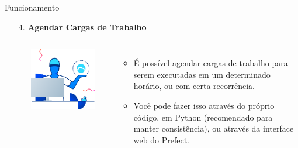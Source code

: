 \documentclass[t,serif]{beamer}
\begin{document}
	\begin{frame}{Funcionamento}
		\begin{enumerate}
			\item[4.] \textbf{Agendar Cargas de Trabalho}
			\begin{columns}
					\\
					\begin{center}
						\includegraphics[width=\linewidth]{figs/2_4.png}
					\end{center}
					\\
					\begin{itemize}
						\item É possível agendar cargas de trabalho para serem executadas em um determinado horário, ou com certa recorrência. 
						\item Você pode fazer isso através do próprio código, em Python (recomendado para manter consistência), ou através da interface web do Prefect.
					\end{itemize}
			\end{columns}
		\end{enumerate}
	\end{frame}
	
\end{document}
